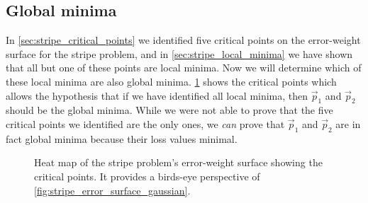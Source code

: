 \subsection{Global minima}
In \ref{sec:stripe_critical_points} we identified five critical points on the error-weight surface for the stripe problem, and in \ref{sec:stripe_local_minima} we have shown that all but one of these points are local minima.
Now we will determine which of these local minima are also global minima.
\ref{fig:stripe_critical_points} shows the critical points which allows the hypothesis that if we have identified all local minima, then $\vec{p}_1$ and $\vec{p}_2$ should be the global minima.
While we were not able to prove that the five critical points we identified are the only ones, we \textit{can} prove that $\vec{p}_1$ and $\vec{p}_2$ are in fact global minima because their loss values minimal.
\begin{figure}
    \centering
    \caption{Heat map of the stripe problem's error-weight surface showing the critical points. It provides a birds-eye perspective of \ref{fig:stripe_error_surface_gaussian}.}
    \label{fig:stripe_critical_points}
\end{figure}

